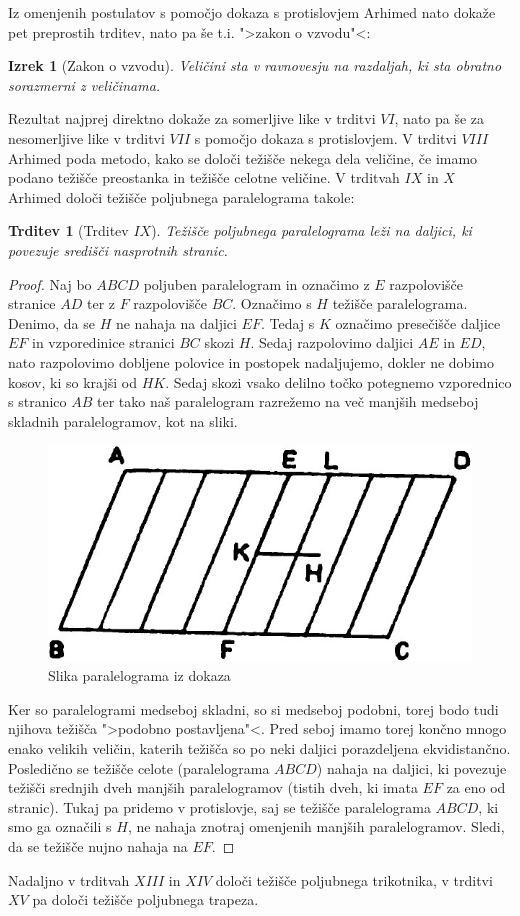 \documentclass[a4paper, 10pt]{article}
\newtheorem*{izr*}{Izrek}
\newtheorem*{trd*}{Trditev}
\begin{document}
		Iz omenjenih postulatov s pomočjo dokaza s protislovjem Arhimed nato dokaže pet preprostih trditev, nato pa še t.i. ">zakon o vzvodu"<:\begin{izr*}[Zakon o vzvodu]
			Veličini sta v ravnovesju na razdaljah, ki sta obratno sorazmerni z veličinama.
		\end{izr*} 
		Rezultat najprej direktno dokaže za somerljive like v trditvi $VI$, nato pa še za nesomerljive like v trditvi $VII$ s pomočjo dokaza s protislovjem. V trditvi $VIII$ Arhimed poda metodo, kako se določi težišče nekega dela veličine, če imamo podano težišče preostanka in težišče celotne veličine. V trditvah $IX$ in $X$ Arhimed določi težišče poljubnega paralelograma takole: 
		\begin{trd*}[Trditev $IX$]
			Težišče poljubnega paralelograma leži na daljici, ki povezuje središči nasprotnih stranic.
		\end{trd*}
		\begin{proof}
			Naj bo $ABCD$ poljuben paralelogram in označimo z $E$ razpolovišče stranice $AD$ ter z $F$ razpolovišče $BC$. Označimo s $H$ težišče paralelograma. Denimo, da se $H$ ne nahaja na daljici $EF$. Tedaj s $K$ označimo presečišče daljice $EF$ in vzporedinice stranici $BC$ skozi $H$. Sedaj razpolovimo daljici $AE$ in $ED$, nato razpolovimo dobljene polovice in postopek nadaljujemo, dokler ne dobimo kosov, ki so krajši od $HK$. Sedaj skozi vsako delilno točko potegnemo vzporednico s stranico $AB$ ter tako naš paralelogram razrežemo na več manjših medseboj skladnih paralelogramov, kot na sliki.
			\begin{figure}[h!]
				\centering
				\includegraphics[scale=0.5]{Paralelogram.jpg}
				\caption{Slika paralelograma iz dokaza}
			\end{figure}
			Ker so paralelogrami medseboj skladni, so si medseboj podobni, torej bodo tudi njihova težišča ">podobno postavljena"<. Pred seboj imamo torej končno mnogo enako velikih veličin, katerih težišča so po neki daljici porazdeljena ekvidistančno. Posledično se težišče celote (paralelograma $ABCD$) nahaja na daljici, ki povezuje težišči srednjih dveh manjših paralelogramov (tistih dveh, ki imata $EF$ za eno od stranic). Tukaj pa pridemo v protislovje, saj se težišče paralelograma $ABCD$, ki smo ga označili s $H$, ne nahaja znotraj omenjenih manjših paralelogramov. Sledi, da se težišče nujno nahaja na $EF$.
		\end{proof}
		Nadaljno v trditvah $XIII$ in $XIV$ določi težišče poljubnega trikotnika, v trditvi $XV$ pa določi težišče poljubnega trapeza. 
\end{document}
